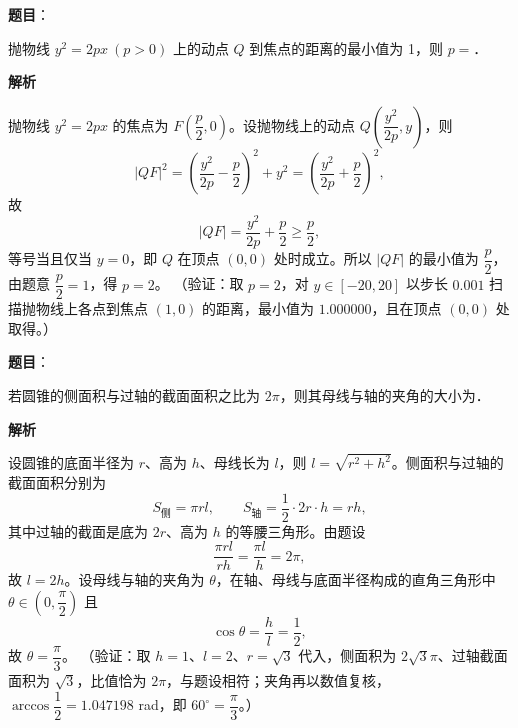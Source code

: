 \begin{answer}

\textbf{题目}：

抛物线 \(y^{2}=2px\ (p>0)\) 上的动点 \(Q\) 到焦点的距离的最小值为 1，则 \(p=\)\gkblank{}．

\textbf{解析}

抛物线 \(y^{2}=2px\) 的焦点为 \(F\left(\dfrac{p}{2},0\right)\)。设抛物线上的动点 \(Q\left(\dfrac{y^{2}}{2p},y\right)\)，则
\nopagebreak[4]
\[
|QF|^{2}=\left(\frac{y^{2}}{2p}-\frac{p}{2}\right)^{2}+y^{2}=\left(\frac{y^{2}}{2p}+\frac{p}{2}\right)^{2},
\]
故
\nopagebreak[4]
\[
|QF|=\frac{y^{2}}{2p}+\frac{p}{2}\geqslant\frac{p}{2},
\]
等号当且仅当 \(y=0\)，即 \(Q\) 在顶点 \((0,0)\) 处时成立。所以 \(|QF|\) 的最小值为 \(\dfrac{p}{2}\)，由题意 \(\dfrac{p}{2}=1\)，得 \(p=2\)。
（验证：取 \(p=2\)，对 \(y\in[-20,20]\) 以步长 \(0.001\) 扫描抛物线上各点到焦点 \((1,0)\) 的距离，最小值为 \(1.000000\)，且在顶点 \((0,0)\) 处取得。）


\end{answer}
\begin{answer}

\textbf{题目}：

若圆锥的侧面积与过轴的截面面积之比为 \(2\pi\)，则其母线与轴的夹角的大小为\gkblank{}．

\textbf{解析}

设圆锥的底面半径为 \(r\)、高为 \(h\)、母线长为 \(l\)，则 \(l=\sqrt{r^{2}+h^{2}}\)。侧面积与过轴的截面面积分别为
\nopagebreak[4]
\[
S_{\text{侧}}=\pi rl,\qquad S_{\text{轴}}=\frac{1}{2}\cdot2r\cdot h=rh,
\]
其中过轴的截面是底为 \(2r\)、高为 \(h\) 的等腰三角形。由题设
\nopagebreak[4]
\[
\frac{\pi rl}{rh}=\frac{\pi l}{h}=2\pi,
\]
故 \(l=2h\)。设母线与轴的夹角为 \(\theta\)，在轴、母线与底面半径构成的直角三角形中 \(\theta\in\left(0,\dfrac{\pi}{2}\right)\) 且
\nopagebreak[4]
\[
\cos\theta=\frac{h}{l}=\frac{1}{2},
\]
故 \(\theta=\dfrac{\pi}{3}\)。
（验证：取 \(h=1\)、\(l=2\)、\(r=\sqrt{3}\) 代入，侧面积为 \(2\sqrt{3}\pi\)、过轴截面面积为 \(\sqrt{3}\)，比值恰为 \(2\pi\)，与题设相符；夹角再以数值复核，\(\arccos\dfrac{1}{2}=1.047198\) rad，即 \(60^{\circ}=\dfrac{\pi}{3}\)。）


\end{answer}
